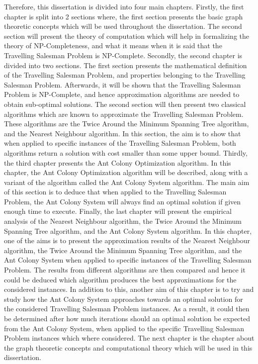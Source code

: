 \documentclass[12pt]{article}
\numberwithin{equation}{subsection}
\numberwithin{table}{subsection}
\numberwithin{algorithm}{subsection}
\numberwithin{figure}{subsection}
\begin{document}
Therefore, this dissertation is divided into four main chapters. Firstly, the first chapter is split into 2 sections where, the first section presents the basic graph theoretic concepts which will be used throughout the dissertation. The second section will present the theory of computation which will help in formalizing the theory of NP-Completeness, and what it means when it is said that the Travelling Salesman Problem is NP-Complete. Secondly, the second chapter is divided into two sections. The first section presents the mathematical definition of the Travelling Salesman Problem, and properties belonging to the Travelling Salesman Problem. Afterwards, it will be shown that the Travelling Salesman Problem is NP-Complete, and hence approximation algorithms are needed to obtain sub-optimal solutions. The second section will then present two classical algorithms which are known to approximate the Travelling Salesman Problem. These algorithms are the Twice Around the Minimum Spanning Tree algorithm, and the Nearest Neighbour algorithm. In this section, the aim is to show that when applied to specific instances of the Travelling Salesman Problem, both algorithms return a solution with cost smaller than some upper bound. Thirdly, the third chapter presents the Ant Colony Optimization algorithm. In this chapter, the Ant Colony Optimization algorithm will be described, along with a variant of the algorithm called the Ant Colony System algorithm. The main aim of this section is to deduce that when applied to the Travelling Salesman Problem, the Ant Colony System will always find an optimal solution if given enough time to execute. Finally, the last chapter will present the empirical analysis of the Nearest Neighbour algorithm, the Twice Around the Minimum Spanning Tree algorithm, and the Ant Colony System algorithm. In this chapter, one of the aims is to present the approximation results of the Nearest Neighbour algorithm, the Twice Around the Minimum Spanning Tree algorithm, and the Ant Colony System when applied to specific instances of the Travelling Salesman Problem. The results from different algorithms are then compared and hence it could be deduced which algorithm produces the best approximations for the considered instances. In addition to this, another aim of this chapter is to try and study how the Ant Colony System approaches towards an optimal solution for the considered Travelling Salesman Problem instances. As a result, it could then be determined after how much iterations should an optimal solution be expected from the Ant Colony System, when applied to the specific Travelling Salesman Problem instances which where considered. The next chapter is the chapter about the graph theoretic concepts and computational theory which will be used in this dissertation.
\end{document}
